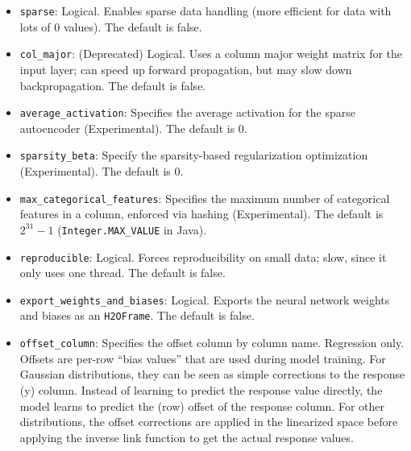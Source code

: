 {{\begin{itemize}
\item \texttt{sparse}: Logical. Enables sparse data handling (more efficient for data with lots of 0 values).
The default is false.

\item \texttt{col\_major}: (Deprecated) Logical. Uses a column major weight matrix for the input layer; can speed up forward propagation, but may slow down backpropagation. The default is false.

\item \texttt{average\_activation}: Specifies the average activation for the sparse autoencoder (Experimental).
The default is 0.

\item \texttt{sparsity\_beta}: Specify the sparsity-based regularization optimization (Experimental).  The default is 0. 

\item \texttt{max\_categorical\_features}:  Specifies the maximum number of categorical features in a column, enforced via hashing (Experimental).  The default is $2^{31}-1$ (\texttt{Integer.MAX\_VALUE} in Java).

\item \texttt{reproducible}: Logical. Forces reproducibility on small data; slow, since it only uses one thread.  The default is false.

\item \texttt{export\_weights\_and\_biases}: Logical. Exports the neural network weights and biases as an \texttt{H2OFrame}.  The default is false.

%

\item \texttt{offset\_column}:  Specifies the offset column by column name.  Regression only.  Offsets are per-row ``bias values'' that are used during model training. For Gaussian distributions, they can be seen as simple corrections to the response (y) column. Instead of learning to predict the response value directly, the model learns to predict the (row) offset of the response column. For other distributions, the offset corrections are applied in the linearized space before applying the inverse link function to get the actual response values. 


\end{itemize}}}

